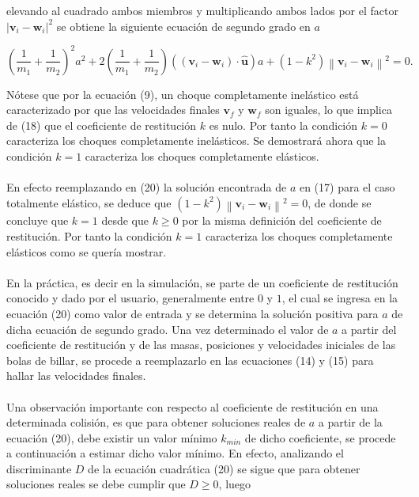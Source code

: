 \documentclass{article}
\newcommand{\norm}[1]{\left\lVert#1\right\rVert}
\begin{document}
elevando al cuadrado ambos miembros y multiplicando ambos lados por el factor $|\textbf{v}_{i}-\textbf{w}_{i}|^2$ se obtiene la siguiente ecuación de segundo grado en $a$

\begin{equation}
    \left(\frac{1}{m_1}+\frac{1}{m_2}\right)^2a^2+2\left(\frac{1}{m_1}+\frac{1}{m_2}\right)((\textbf{v}_{i}-\textbf{w}_{i})\cdot \hat{\textbf{u}})a+(1-k^2)\norm{\textbf{v}_{i}-\textbf{w}_{i}}^2=0.
\end{equation}

Nótese que por la ecuación (9), un choque completamente inelástico está caracterizado por que las velocidades finales $\textbf{v}_{f}$ y $\textbf{w}_{f}$ son iguales, lo que implica de (18) que el coeficiente de restitución $k$ es nulo. Por tanto la condición $k=0$ caracteriza los choques completamente inelásticos. Se demostrará ahora que la condición $k=1$ caracteriza los choques completamente elásticos.\\\\En efecto reemplazando en (20) la solución encontrada de $a$ en (17) para el caso totalmente elástico, se deduce que $(1-k^2)\norm{\textbf{v}_{i}-\textbf{w}_{i}}^2=0$, de donde se concluye que $k=1$ desde que $k\geq 0$ por la misma definición del coeficiente de restitución. Por tanto la condición $k=1$ caracteriza los choques completamente elásticos como se quería mostrar.\\\\ En la práctica, es decir en la simulación, se parte de un coeficiente de restitución conocido y dado por el usuario, generalmente entre $0$ y $1$, el cual se ingresa en la ecuación (20) como valor de entrada y se determina la solución positiva para $a$ de dicha ecuación de segundo grado. Una vez determinado el valor de $a$ a partir del coeficiente de restitución y de las masas, posiciones y velocidades iniciales  de las bolas de billar, se procede a reemplazarlo en las ecuaciones (14) y (15) para hallar las velocidades finales.\\\\
Una observación importante con respecto al coeficiente de restitución en una determinada colisión, es que para obtener soluciones reales de $a$ a partir de la ecuación (20), debe existir un valor mínimo $k_{min}$ de dicho coeficiente, se procede a continuación a estimar dicho valor mínimo. En efecto, analizando el discriminante $D$ de la ecuación cuadrática (20) se sigue que para obtener soluciones reales se debe cumplir que $D\geq0$, luego
\end{document}
